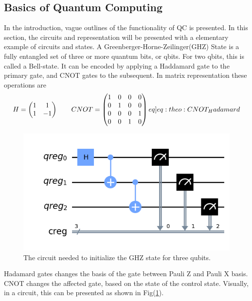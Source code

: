 \subsection{Basics of Quantum Computing}
In the introduction, vague outlines of the functionality of QC is presented. In this section, the circuits and representation will be presented with a elementary example of circuits and states. A Greenberger-Horne-Zeilinger(GHZ) State is a  fully entangled set of three or more quantum bits, or qbits. For two qbits, this is called a Bell-state. It can be encoded by applying a Haddamard gate to the primary gate, and CNOT gates to the subsequent. In matrix representation these operations are
\begin{equation}
    H = \begin{pmatrix}
    1 & 1 \\
    1 & -1 
    \end{pmatrix} \qquad 
    CNOT = \begin{pmatrix}
    1 & 0 & 0 & 0 \\
    0 & 1 & 0 & 0 \\
    0 & 0 & 0 & 1 \\
    0 & 0 & 1 & 0 
    \end{pmatrix} \label[eq]{eq:theo:CNOT_Hadamard}
\end{equation}
\vspace{-3.31cm}
\begin{figure}[H]
    \centering
    \includegraphics[width=\linewidth]{figs/GHZ.png}
    \caption{The circuit needed to initialize the GHZ state for three qubits.}
    \label{fig:GHZ_circ}
\end{figure}
Hadamard gates changes the basis of the gate between Pauli Z and Pauli X basis. CNOT changes the affected gate, based on the state of the control state. Visually, in a circuit, this can be presented as shown in Fig(\ref{fig:GHZ_circ}).

